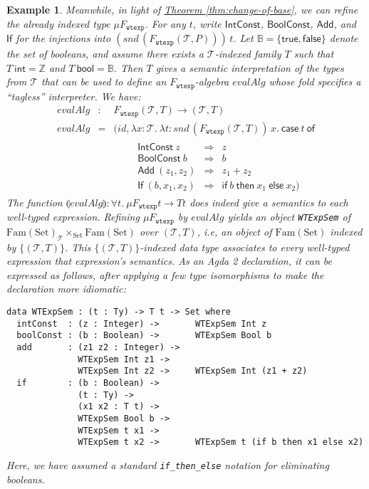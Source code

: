 \documentclass{LMCS}
\newcommand{\tyname}[1]{\texttt{#1}}
\newcommand{\fold}[1]{\llparenthesis #1 \rrparenthesis}
\newcommand{\Fam}{\mathrm{Fam}}
\newcommand{\Set}{\mathrm{Set}}
\newtheorem{eorollary}{Example}
\newcommand{\thmref}[1]{\hyperref[#1]{Theorem \ref*{#1}}}
\begin{document}
\begin{eorollary}
Meanwhile, in light of \thmref{thm:change-of-base}, we can refine the
already indexed type $\mu F_{\tyname{wtexp}}$. For any $t$, write
$\mathsf{IntConst}$, $\mathsf{BoolConst}$, $\mathsf{Add}$, and
$\mathsf{If}$ for the injections into $(\mathit{snd}\,
(F_{\tyname{wtexp}}(\mathcal{T},P)))\, t$. Let $\mathbb{B} = \{
\mathsf{true}, \mathsf{false} \}$ denote the set of booleans, and
assume there exists a $\mathcal{T}$-indexed family $T$ such that $T\
\mathsf{int} = \mathbb{Z}$ and $T\ \mathsf{bool} = \mathbb{B}$. Then
$T$ gives a semantic interpretation of the types from $\mathcal T$
that can be used to define an $F_{\tyname{wtexp}}$-algebra
$\mathit{evalAlg}$ whose fold specifies a ``tagless'' interpreter. We
have:
\begin{displaymath}
 \begin{array}{lll}
   \mathit{evalAlg} & : & F_{\tyname{wtexp}}(\mathcal{T},T) \to (\mathcal{T},T) \\
   \mathit{evalAlg} & = & (\mathit{id}, \lambda x : \mathcal{T}.\
   \lambda t : \mathit{snd}\, (F_{\tyname{wtexp}}
   (\mathcal{T},T))\, x.\
   \mathsf{case}\ t\ \mathsf{of} \\
   & & \quad\begin{array}{lll}
     \quad\mathsf{IntConst}\ z  & \Rightarrow & z\\
     \quad\mathsf{BoolConst}\ b  & \Rightarrow & b\\
     \quad\mathsf{Add}\ (z_1, z_2) &
           \Rightarrow  & z_1 + z_2 \\  
     \quad\mathsf{If}\ (b, x_1, x_2) &
           \Rightarrow & \mathsf{if}\  b\  \mathsf{then}\ 
           x_1\ \mathsf{else}\ x_2) 
       \end{array}
  \end{array}
\end{displaymath}
The function $\fold{\mathit{evalAlg}} : \forall t.\ \mu
F_{\tyname{wtexp}}t \to Tt$ does indeed give a semantics to each
well-typed expression. Refining $\mu F_{\tyname{wtexp}}$ by
$\mathit{evalAlg}$ yields an object \verb|WTExpSem| of
$\Fam(\Set)_{\mathcal{T}} \times_{\Set} \Fam(\Set)$ over
$(\mathcal{T},T)$, i.e, an object of $\Fam(\Set)$ indexed by
$\{(\mathcal{T},T)\}$. This $\{(\mathcal{T},T)\}$-indexed data type
associates to every well-typed expression that expression's
semantics. As an Agda 2 declaration, it can be expressed as follows,
after applying a few type isomorphisms to make the declaration more
idiomatic:
\begin{verbatim}
data WTExpSem : (t : Ty) -> T t -> Set where
  intConst  : (z : Integer) ->       WTExpSem Int z
  boolConst : (b : Boolean) ->       WTExpSem Bool b
  add       : (z1 z2 : Integer) ->
              WTExpSem Int z1 ->
              WTExpSem Int z2 ->     WTExpSem Int (z1 + z2)
  if        : (b : Boolean) ->
              (t : Ty) ->
              (x1 x2 : T t) ->
              WTExpSem Bool b ->
              WTExpSem t x1 ->
              WTExpSem t x2 ->       WTExpSem t (if b then x1 else x2)
\end{verbatim}
Here, we have assumed a standard \texttt{if\_then\_else} notation for
eliminating booleans.
\end{eorollary}
\end{document}
